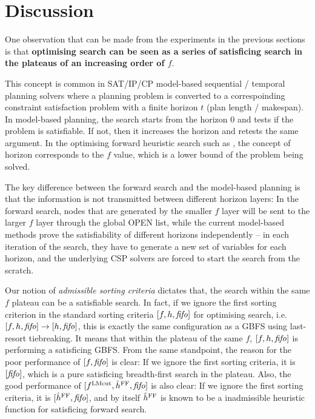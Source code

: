 \clearpage 
\section{Discussion}
\label{sec:discussion}

One observation that can be made from the experiments in the previous
sections is that \textbf{optimising search can be seen as a series of
satisficing search in the plateaus of an increasing order of $f$}.

This concept is common in SAT/IP/CP model-based sequential / temporal planning
solvers where a planning problem is converted to a correspoinding
constraint satisfaction problem with a finite horizon $t$ (plan length /
makespan). In model-based planning, the search starts from the horizon 0 and
tests if the problem is satisfiable. If not, then it increases the
horizon and retests the same argument.  In the optimising forward
heuristic search such as \astar, the concept of horizon
corresponds to the $f$ value, which is a lower bound of the problem
being solved.

The key difference between the forward search and the model-based planning is
that the information is not transmitted between different horizon
layers: In the forward search, nodes that are generated by the smaller
$f$ layer will be sent to the larger $f$ layer through the global OPEN
list, while the current model-based methods prove the satisfiability of
different horizons independently -- in each iteration of the search,
they have to generate a new set of variables for each horizon, and the
underlying CSP solvers are forced to start the search from the scratch.

Our notion of \emph{admissible sorting criteria} dictates that, the
search within the same $f$ plateau can be a satisfiable search. In fact,
if we ignore the first sorting criterion in the standard sorting criteria
$[f,h,{\text{\textit{fifo}}}]$ for optimising search, i.e. $[f,h,{\text{\textit{fifo}}}] \rightarrow [h,{\text{\textit{fifo}}}]$, this is exactly
the same configuration as a GBFS using \fifo last-resort tiebreaking. It
means that within the plateau of the same $f$, $[f,h,{\text{\textit{fifo}}}]$ is
performing a satisficing GBFS.
From the same standpoint, the reason for the poor performance of $[f,{\text{\textit{fifo}}}]$
is clear: If we ignore the first sorting criteria, it is $[{\text{\textit{fifo}}}]$,
which is a pure satisficing breadth-first search in the plateau.
Also, the good performance of $[f^{\text{LMcut}},\hat{h}^{\text{FF}},{\text{\textit{fifo}}}]$ is also clear:
If we ignore the first sorting criteria, it is $[\hat{h}^{\text{FF}},{\text{\textit{fifo}}}]$,
and by itself $\hat{h}^{\text{FF}}$ is known to be a \sota inadmissible heuristic
function for satisficing forward search.

